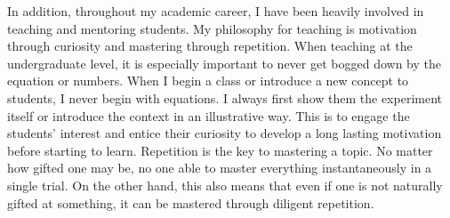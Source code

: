 \documentclass[10pt,a4paper,sans]{moderncv}        %
\begin{document}


In addition, throughout my academic career, I have been heavily involved in
teaching and mentoring students. My philosophy for teaching is motivation
through curiosity and mastering through repetition. When teaching at the
undergraduate level, it is especially important to never get bogged down by the
equation or numbers. When I begin a class or introduce a new concept to
students, I never begin with equations. I always first show them the experiment
itself or introduce the context in an illustrative way. This is to engage the
students' interest and entice their curiosity to develop a long lasting
motivation before starting to learn. Repetition is the key to mastering a
topic. No matter how gifted one may be, no one able to master everything
instantaneously in a single trial. On the other hand, this also means that even
if one is not naturally gifted at something, it can be mastered through
diligent repetition.

\end{document}
